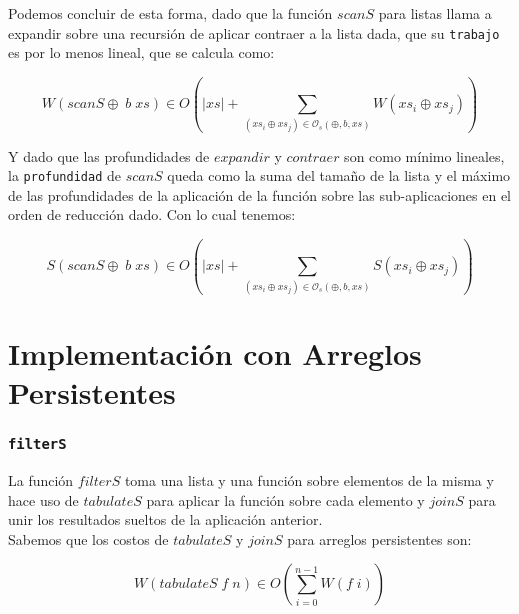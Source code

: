 \documentclass[a4paper,10pt]{article}
\begin{document}
    Podemos concluir de esta forma, dado que la función $scanS$ para listas llama a 
expandir sobre una recursión de aplicar contraer a la lista dada, que su \texttt{trabajo} 
es por lo menos lineal, que se calcula como:

\begin{equation*}
    W \left( scanS \oplus \; b \; xs \right) \in
    O \left( \vert xs \vert + \sum_{(xs_i \oplus xs_j) \in \mathcal{O}_s(\oplus,b,xs)} W \left( xs_i \oplus xs_j \right) \right)
\end{equation*}

    Y dado que las profundidades de $expandir$ y $contraer$ son como mínimo lineales,
la \texttt{profundidad} de $scanS$ queda como la suma del tamaño de la lista y el
máximo de las profundidades de la aplicación de la función sobre las sub-aplicaciones
en el orden de reducción dado. Con lo cual tenemos:

\begin{equation*}
    S \left( scanS \oplus \; b \; xs \right) \in
    O \left( \vert xs \vert + \sum_{(xs_i \oplus xs_j) \in \mathcal{O}_s(\oplus,b,xs)} S \left( xs_i \oplus xs_j \right) \right)
\end{equation*}





\bigskip
\newpage{}





\part*{Implementación con Arreglos Persistentes}

\section*{\texttt{filterS}}

    La función $filterS$ toma una lista y una función sobre elementos de la misma
y hace uso de $tabulateS$ para aplicar la función sobre cada elemento y $joinS$ para
unir los resultados sueltos de la aplicación anterior.\\
    Sabemos que los costos de $tabulateS$ y $joinS$ para arreglos persistentes son:

\begin{equation*}
    W \left(tabulateS \;f \;n \right) \in
    O \left( \sum_{i=0}^{n-1} W \left( f\; i \right) \right)
\end{equation*}
\end{document}
